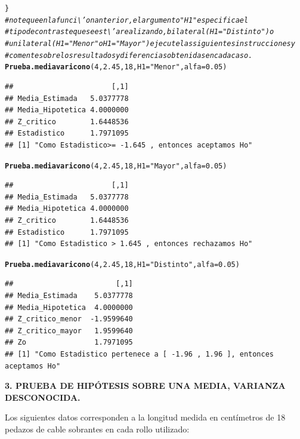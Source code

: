 \documentclass[12pt,letterpaper]{article}\usepackage[]{graphicx}\usepackage[]{color}
\makeatletter
\newcommand{\hlnum}[1]{\textcolor[rgb]{0.686,0.059,0.569}{#1}}%
\newcommand{\hlstr}[1]{\textcolor[rgb]{0.192,0.494,0.8}{#1}}%
\newcommand{\hlcom}[1]{\textcolor[rgb]{0.678,0.584,0.686}{\textit{#1}}}%
\newcommand{\hlstd}[1]{\textcolor[rgb]{0.345,0.345,0.345}{#1}}%
\newcommand{\hlkwc}[1]{\textcolor[rgb]{0.333,0.667,0.333}{#1}}%
\newcommand{\hlkwd}[1]{\textcolor[rgb]{0.737,0.353,0.396}{\textbf{#1}}}%
\newenvironment{kframe}{%
 \def\at@end@of@kframe{}%
 \ifinner\ifhmode%
  \def\at@end@of@kframe{\end{minipage}}%
  \begin{minipage}{\columnwidth}%
 \fi\fi%
 \def\FrameCommand##1{\hskip\@totalleftmargin \hskip-\fboxsep
 \colorbox{shadecolor}{##1}\hskip-\fboxsep
     \hskip-\linewidth \hskip-\@totalleftmargin \hskip\columnwidth}%
 \MakeFramed {\advance\hsize-\width
   \@totalleftmargin\z@ \linewidth\hsize
   \@setminipage}}%
 {\par\unskip\endMakeFramed%
 \at@end@of@kframe}
\newenvironment{knitrout}{}{} %
\makeatother
\begin{document}
\begin{knitrout}
\begin{kframe}
\begin{alltt}
\hlstd{\}}
\hlcom{# note que en la funci\textbackslash{}'on anterior, el argumento "H1" especifica el }
\hlcom{# tipo de contraste que se est\textbackslash{}'a realizando, bilateral (H1= "Distinto") o }
\hlcom{# unilateral (H1= "Menor" o H1= "Mayor") ejecute las siguientes instrucciones y }
\hlcom{# comente sobre los resultados y diferencias obtenidas en cada caso. }
\hlkwd{Prueba.mediavaricono} \hlstd{(}\hlnum{4}\hlstd{,} \hlnum{2.45}\hlstd{,} \hlnum{18}\hlstd{,} \hlkwc{H1}\hlstd{=}\hlstr{"Menor"}\hlstd{,} \hlkwc{alfa}\hlstd{=}\hlnum{0.05}\hlstd{)}
\end{alltt}
\begin{verbatim}
##                       [,1]
## Media_Estimada   5.0377778
## Media_Hipotetica 4.0000000
## Z_critico        1.6448536
## Estadistico      1.7971095
## [1] "Como Estadistico>= -1.645 , entonces aceptamos Ho"
\end{verbatim}
\begin{alltt}
\hlkwd{Prueba.mediavaricono} \hlstd{(}\hlnum{4}\hlstd{,} \hlnum{2.45}\hlstd{,} \hlnum{18}\hlstd{,} \hlkwc{H1}\hlstd{=}\hlstr{"Mayor"}\hlstd{,} \hlkwc{alfa}\hlstd{=}\hlnum{0.05}\hlstd{)}
\end{alltt}
\begin{verbatim}
##                       [,1]
## Media_Estimada   5.0377778
## Media_Hipotetica 4.0000000
## Z_critico        1.6448536
## Estadistico      1.7971095
## [1] "Como Estadistico > 1.645 , entonces rechazamos Ho"
\end{verbatim}
\begin{alltt}
\hlkwd{Prueba.mediavaricono} \hlstd{(}\hlnum{4}\hlstd{,} \hlnum{2.45}\hlstd{,} \hlnum{18}\hlstd{,} \hlkwc{H1}\hlstd{=}\hlstr{"Distinto"}\hlstd{,} \hlkwc{alfa}\hlstd{=}\hlnum{0.05}\hlstd{)}
\end{alltt}
\begin{verbatim}
##                        [,1]
## Media_Estimada    5.0377778
## Media_Hipotetica  4.0000000
## Z_critico_menor  -1.9599640
## Z_critico_mayor   1.9599640
## Zo                1.7971095
## [1] "Como Estadistico pertenece a [ -1.96 , 1.96 ], entonces aceptamos Ho"
\end{verbatim}
\end{kframe}
\end{knitrout}


\begin{center}
\textbf{3.  PRUEBA DE HIP\'OTESIS SOBRE UNA MEDIA, VARIANZA DESCONOCIDA.}
\end{center}

Los siguientes datos corresponden a la longitud medida en cent\'imetros de 18 pedazos de cable sobrantes en cada rollo utilizado: 
 
\end{document}
